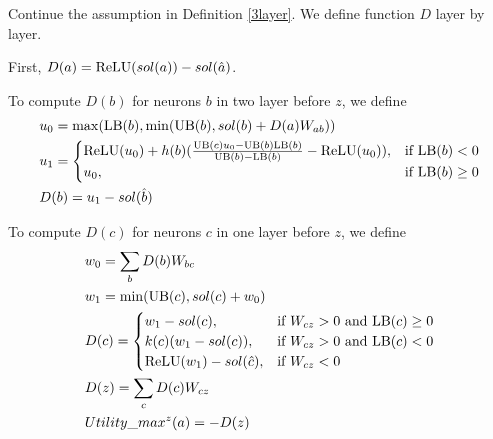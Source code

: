 \begin{definition}
	Continue the assumption in Definition \ref{3layer}. We define function $D$ layer by layer.
	
	First, $D(a) = \mathrm{ReLU}(sol(a))-sol(\hat{a})$.
	
To compute $D(b)$ for neurons $b$ in two layer before $z$, we define \begin{align}
	&u_0 = \max(\mathrm{LB}(b),\min(\mathrm{UB}(b),  sol(b)+D(a)W_{ab}))\\
	&u_1 = \begin{cases}
		\mathrm{ReLU}(u_0)+h(b)(\frac{\mathrm{UB}(c)u_0-\mathrm{UB}(b)\mathrm{LB}(b)}{\mathrm{UB}(b)-\mathrm{LB}(b)}-\mathrm{ReLU}(u_0)), & \text{if }\mathrm{LB}(b) < 0\\
	u_0, & \text{if }  \mathrm{LB}(b) \geq 0
	\end{cases}\\
	&D(b) = u_1-sol(\hat{b})
\end{align}
	
	To compute $D(c)$ for neurons $c$ in one layer before $z$, we define 
	\begin{align}
		&w_0 = \sum_b D(b)W_{bc}\\
		&w_1 = \min(\mathrm{UB}(c),sol(c)+w_0)\\		
		&D(c) =
		\begin{cases}
			w_1-sol({c}), & \text{if }W_{cz} > 0 \text{ and } \mathrm{LB}(c)\geq 0\\
		k(c)(w_1-sol({c})), & \text{if }W_{cz} > 0 \text{ and } \mathrm{LB}(c)< 0\\
		\mathrm{ReLU}(w_1)-sol(\hat{c})	, & \text{if }  W_{cz} < 0
		\end{cases}\\
		&D(z) = \sum_c D(c)W_{cz}\\
		&Utility\_max^z(a) = -D(z)
	\end{align}
\end{definition}
		